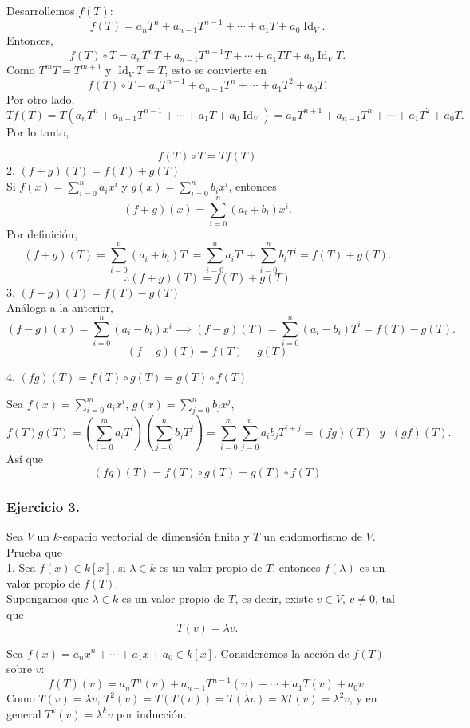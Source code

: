 \documentclass{article}
\theoremstyle{nonumberplain}
\begin{document}
Desarrollemos \( f(T) \):
\[
f(T) = a_n T^n + a_{n-1} T^{n-1} + \cdots + a_1 T + a_0 \operatorname{Id}_V.
\]
Entonces,
\[
f(T) \circ T = a_n T^n T + a_{n-1} T^{n-1} T + \cdots + a_1 T T + a_0 \operatorname{Id}_V T.
\]
Como \( T^m T = T^{m+1} \) y \( \operatorname{Id}_V T = T \), esto se convierte en
\[
f(T) \circ T = a_n T^{n+1} + a_{n-1} T^n + \cdots + a_1 T^2 + a_0 T.
\]
Por otro lado,
\[
T f(T) = T(a_n T^n + a_{n-1} T^{n-1} + \cdots + a_1 T + a_0 \operatorname{Id}_V)
= a_n T^{n+1} + a_{n-1} T^n + \cdots + a_1 T^2 + a_0 T.
\]
Por lo tanto,

\[
\boxed{f(T) \circ T = T f(T)}
\]
2. \( (f+g)(T)=f(T)+g(T) \) \\
Si \( f(x) = \sum_{i=0}^n a_i x^i \) y \( g(x) = \sum_{i=0}^n b_i x^i \), entonces
\[
(f+g)(x) = \sum_{i=0}^n (a_i + b_i) x^i.
\]
Por definición,
\[
(f+g)(T) = \sum_{i=0}^n (a_i + b_i) T^i = \sum_{i=0}^n a_i T^i + \sum_{i=0}^n b_i T^i = f(T) + g(T).
\]
\[
\therefore \boxed{(f+g)(T) = f(T) + g(T)}
\]
3. \( (f-g)(T)=f(T)-g(T) \) \\
Análoga a la anterior,
\[
(f-g)(x) = \sum_{i=0}^n (a_i - b_i) x^i \implies (f-g)(T) = \sum_{i=0}^n (a_i - b_i) T^i = f(T) - g(T).
\]
\[
\boxed{(f-g)(T) = f(T) - g(T)}
\]

4. \( (f g)(T)=f(T) \circ g(T)=g(T) \circ f(T) \)

Sea \( f(x) = \sum_{i=0}^m a_i x^i \), \( g(x) = \sum_{j=0}^n b_j x^j \),
\[
f(T)g(T) = \left( \sum_{i=0}^m a_i T^i \right) \left( \sum_{j=0}^n b_j T^j \right) = \sum_{i=0}^m \sum_{j=0}^n a_i b_j T^{i+j} = (fg)(T) \;\textit{ y } \; (gf)(T).
\]
Así que
\[
\boxed{(fg)(T) = f(T) \circ g(T) = g(T) \circ f(T)}
\]

\subsubsection*{Ejercicio 3.} Sea \( V \) un \( k \)-espacio vectorial de dimensión finita y \( T \) un endomorfismo de \( V \).  \\
Prueba que \\
1. Sea \( f(x) \in k[x] \), si \( \lambda \in k \) es un valor propio de \( T \), entonces \( f(\lambda) \) es un valor propio de \( f(T) \). \\
Supongamos que \( \lambda \in k \) es un valor propio de \( T \), es decir, existe \( v \in V \), \( v \neq 0 \), tal que
\[
T(v) = \lambda v.
\]

Sea \( f(x) = a_n x^n + \cdots + a_1 x + a_0 \in k[x] \). Consideremos la acción de \( f(T) \) sobre \( v \):
\[
f(T)(v) = a_n T^n(v) + a_{n-1} T^{n-1}(v) + \cdots + a_1 T(v) + a_0 v.
\]
Como \( T(v) = \lambda v \), \( T^2(v) = T(T(v)) = T(\lambda v) = \lambda T(v) = \lambda^2 v \), y en general \( T^k(v) = \lambda^k v \) por inducción. \\
\end{document}
